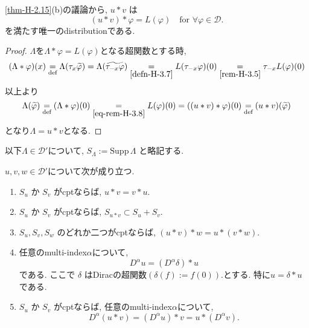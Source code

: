 \begin{rem}%
\label{rem-H-3.8}
\ref{thm-H-2.15}(b)の議論から, \(u \ast v\) は
\[
(u \ast v) \ast \varphi = L(\varphi) \quad \text{for } \forall \varphi \in \mathcal{D}.
\]
を満たす唯一のdistributionである. 

\begin{proof}
$\Lambda$を$\Lambda\ast \varphi = L(\varphi) $となる超関数とする時, 
\begin{align}
\begin{split}
\label{eq-rem-H-3.8}
(\Lambda \ast \varphi)(x)
\underset{\text{def}}{=} \Lambda(\tau_x \widetilde{\varphi})
=\Lambda(\widetilde{ \tau_{-x} \varphi})
\underset{\ref{defn-H-3.7}}{=} L(\tau_{-x} \varphi)(0) \underset{\ref{rem-H-3.5}}{=}
\tau_{-x} L( \varphi)(0) \\
\end{split}
\end{align}
以上より
$$
\Lambda (\widetilde{\varphi})
\underset{\text{def}}{=}
(\Lambda \ast \varphi)(0)
\underset{\ref{eq-rem-H-3.8}}{=}
L( \varphi)(0)
=((u \ast v) \ast \varphi)(0)
\underset{\text{def}}{=}
(u \ast v)(\widetilde{\varphi})
$$
となり$\Lambda=u \ast v$となる. 
\end{proof}
\end{rem}


\begin{tcolorbox}[mybox]
\begin{thm}\cite[Theorem 6.37]{Rud}
\label{thm-H-3.7}
以下\(\Lambda \in \mathcal{D}'\)について,  \( S_\Lambda := \mathrm{Supp}\, \Lambda \) と略記する. 

\( u, v, w \in \mathcal{D}' \)について次が成り立つ. 
\begin{enumerate}[label=$(\alph*)$]
\item \(S_u\) か \(S_v\) がcptならば,  \(u \ast v = v \ast u.\)
\item\(S_u\) か \(S_v\) がcptならば,  \(S_{u \ast v} \subset S_u + S_v.\)
\item  \(S_u, S_v, S_w\) のどれか二つがcptならば,  \((u \ast v) \ast w = u \ast (v \ast w).\)
\item 任意のmulti-index\( \alpha\)について, 
\[
D^\alpha u = (D^\alpha \delta) \ast u
\]
である. ここで \(\delta\) はDiracの超関数\(\left(\delta(f) :=  f(0)\right).\)とする. 
特に\(u = \delta \ast u\)である. 
\item \(S_u\) か \(S_v\) がcptならば, 任意のmulti-index\( \alpha\)について, 
\[
D^\alpha (u \ast v) = (D^\alpha u) \ast v = u \ast (D^\alpha v).
\]
\end{enumerate}
\end{thm}
\end{tcolorbox}


